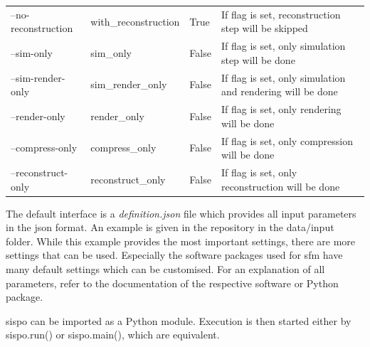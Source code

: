 \begin{table}[htb]
\begin{tabular}{p{}|p{}|p{}|p{}}
        \multicolumn{1}{l|}{--no-reconstruction} & with\_reconstruction   & True                       & If flag is set,        reconstruction step will be skipped                                                                       \\
        \multicolumn{1}{l|}{--sim-only}          & sim\_only              & False                      & If flag is set,        only simulation step will be done                                                                         \\
        \multicolumn{1}{l|}{--sim-render-only}   & sim\_render\_only      & False                      & If flag is set,        only simulation and rendering will be done                                                                \\
        \multicolumn{1}{l|}{--render-only}       & render\_only           & False                      & If flag is set,        only rendering will be done                                                                               \\
        \multicolumn{1}{l|}{--compress-only}     & compress\_only         & False                      & If flag is set,        only compression will be done                                                                             \\
        \multicolumn{1}{l|}{--reconstruct-only}  & reconstruct\_only      & False                      & If flag is set, only reconstruction will be done       
    \end{tabular}
\end{table}

The default interface is a \textit{definition.json} file which provides all input parameters in the \gls{json} format. An example is given in the repository in the data/input folder. While this example provides the most important settings, there are more settings that can be used. Especially the software packages used for \gls{sfm} have many default settings which can be customised. For an explanation of all parameters, refer to the documentation of the respective software or Python package.

\gls{sispo} can be imported as a Python module. Execution is then started either by sispo.run() or sispo.main(), which are equivalent.

